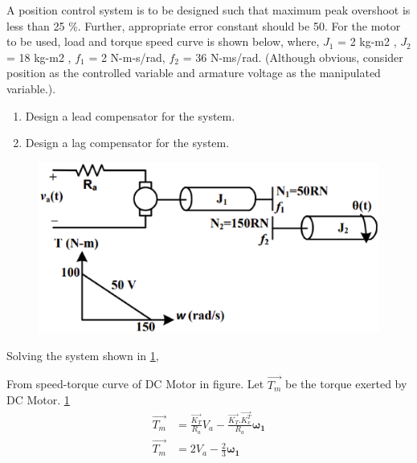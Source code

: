 \item A position control system is to be designed such that maximum peak overshoot is less than 25 \%.
Further, appropriate error constant should be 50. For the motor to be used, load and torque
speed curve is shown below, where, $J_{1}$ = 2 kg-m2
, $J_{2}$ = 18 kg-m2
, $f_{1}$ = 2 N-m-s/rad, $f_{2}$ = 36 N-ms/rad. (Although obvious, consider position as the controlled variable and armature voltage as
the manipulated variable.). 
\begin{enumerate}[label=(\roman*)]
\item Design a lead compensator for the system.
\item Design a lag compensator for the system.
\end{enumerate}

\begin{figure}[!ht]
\centering
    \includegraphics[width=\columnwidth]{./figs/ee18btech11001/ee18btech11001_1.eps}
  \caption{}
  \label{fig:ee18btech11001_fig1}
\end{figure}
%
\solution
Solving the system shown in \ref{fig:ee18btech11001_fig1},

From speed-torque curve of DC Motor in figure. Let $\vec{T_{m}}$ be the torque exerted by DC Motor.  \ref{fig:ee18btech11001_fig1}
\begin{align}
   \vec{T_{m}} &=  \frac{\vec{K_{T}}}{R_{a}}V_{a} - \frac{\vec{K_{T}}.\vec{K_{v}^{T}}}{R_{a}}\bm{\omega_{1}}
   \\
   \vec{T_{m}} &=  2V_{a} - \frac{2}{3}\bm{\omega_{1}}
    \label{eq:ee18btech11001_1}
\end{align}

